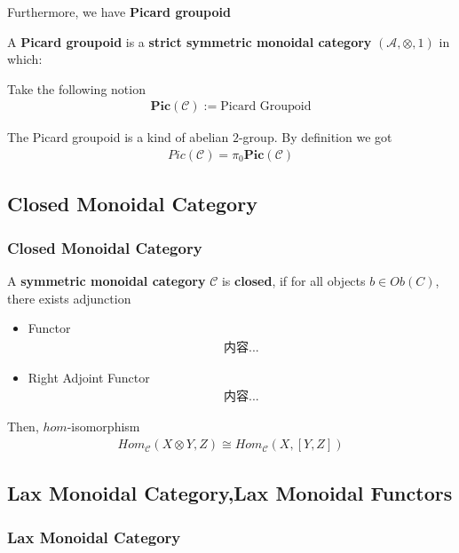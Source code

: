 \documentclass[Total.tex]{subfiles}
\begin{document}
				Furthermore, we have \textbf{Picard groupoid}
				\begin{Def}
					A \textbf{Picard groupoid} is a \textbf{strict symmetric monoidal category} $(\mathcal{A},\otimes,1)$ in which:
					
					Take the following notion
					\begin{gather*}
						\mathbf{Pic}(\mathcal{C}):=\mbox{Picard Groupoid}
					\end{gather*}
				\end{Def}
				
				The Picard groupoid is a kind of abelian $2$-group. By definition we got
				\begin{gather*}
					Pic(\mathcal{C})=\pi_0\mathbf{Pic} (\mathcal{C})
				\end{gather*}
			\subsection{Closed Monoidal Category}
			\subsubsection{Closed Monoidal Category}
			\begin{Def}
				A \textbf{symmetric monoidal category} $\mathcal{C}$ is \textbf{closed}, if for all objects $b\in Ob(C)$, there exists adjunction
				\begin{itemize}
					\item Functor
					\begin{gather*}
						内容...
					\end{gather*}
					\item Right Adjoint Functor
					\begin{gather*}
						内容...
					\end{gather*}
				\end{itemize}
				
				Then, $hom$-isomorphism
				\begin{gather*}
					Hom_\mathcal{C}(X\otimes Y,Z)\cong Hom_\mathcal{C}(X,[Y,Z])
				\end{gather*}
			\end{Def}
			\subsection{Lax Monoidal Category,Lax Monoidal Functors}
			\subsubsection{Lax Monoidal Category}
			
\end{document}
